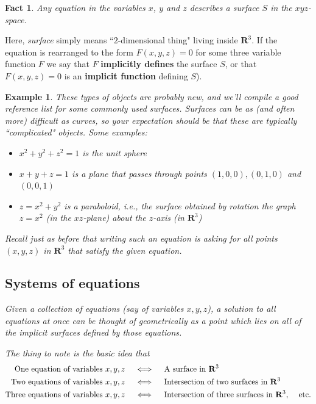 \documentclass[12pt]{article}
\numberwithin{equation}{subsection}
\numberwithin{figure}{subsection}
\newtheorem{fact}[subsection]{Fact}
\theoremstyle{note}
\newtheorem{example}[subsection]{Example}
\begin{document}
{\begin{fact}
Any equation in the variables $x$, $y$ and $z$ describes a surface $S$ in the $xyz$-space.
\end{fact}

Here, \textit{surface} simply means ``$2$-dimensional thing" living inside $\mathbf{R}^3$. If the equation is rearranged to the form $F(x,y,z)=0$ for some three variable function $F$ we say that $F$ \textbf{implicitly defines} the surface $S$, or that $F(x,y,z)=0$ is an \textbf{implicit function} defining $S$). 
 
\begin{example}These types of objects are probably new, and we'll compile a good reference list for some commonly used surfaces. Surfaces can be as (and often more) difficult as curves, so your expectation should be that these are typically ``complicated" objects. Some examples: \begin{itemize}
	\item $x^2+y^2+z^2=1$ is the unit sphere
	\item $x+y+z=1$ is a plane that passes through points $(1,0,0), (0,1,0)$ and $(0,0,1)$
	\item $z=x^2+y^2$ is a \textit{paraboloid}, i.e., the surface obtained by rotation the graph $z=x^2$ (in the $xz$-plane) about the $z$-axis (in $\mathbf{R}^3$)
\end{itemize}
Recall just as before that writing such an equation is asking for all points $(x,y,z)$ in $\mathbf{R}^3$ that satisfy the given equation. 

\subsection{Systems of equations}
Given a collection of equations (say of variables $x,y,z$), a solution to \textit{all} equations at once can be thought of geometrically as a point which lies on all of the implicit surfaces defined by those equations. 

The thing to note is the basic idea that\begin{align*} \text{One equation of variables $x,y,z$} \quad &\iff \quad \text{A surface in $\mathbf{R}^3$}  \\ 
\text{Two equations of variables $x,y,z$} \quad & \iff \quad \text{Intersection of two surfaces in $\mathbf{R}^3$}\\
\text{Three equations of variables $x,y,z$} \quad & \iff \quad \text{Intersection of three surfaces in $\mathbf{R}^3$, \quad etc.}
\end{align*}
\end{example}

}
\end{document}
